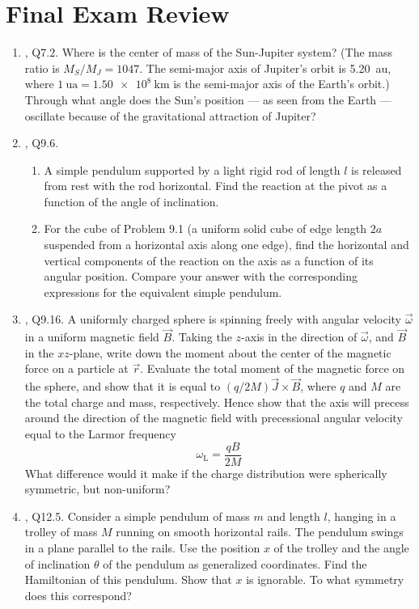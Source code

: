 \documentclass[../psets.tex]{subfiles}
\begin{document}
\section{Final Exam Review}
\begin{enumerate}
    \item {}\textcite{bib:KibbleBerkshire}, Q7.2. Where is the center of mass of the Sun-Jupiter system? (The mass ratio is $M_S/M_J=1047$. The semi-major axis of Jupiter's orbit is \SI{5.20}{\astronomicalunit}, where $\SI{1}{\astronomicalunit}=\SI{1.50e8}{\kilo\meter}$ is the semi-major axis of the Earth's orbit.) Through what angle does the Sun's position --- as seen from the Earth --- oscillate because of the gravitational attraction of Jupiter?
    \item \textcite{bib:KibbleBerkshire}, Q9.6.
    \begin{enumerate}
        \item A simple pendulum supported by a light rigid rod of length $l$ is released from rest with the rod horizontal. Find the reaction at the pivot as a function of the angle of inclination.
        \item For the cube of Problem 9.1 (a uniform solid cube of edge length $2a$ suspended from a horizontal axis along one edge), find the horizontal and vertical components of the reaction on the axis as a function of its angular position. Compare your answer with the corresponding expressions for the equivalent simple pendulum.
    \end{enumerate}
    \item \textcite{bib:KibbleBerkshire}, Q9.16. A uniformly charged sphere is spinning freely with angular velocity $\vec{\omega}$ in a uniform magnetic field $\vec{B}$. Taking the $z$-axis in the direction of $\vec{\omega}$, and $\vec{B}$ in the $xz$-plane, write down the moment about the center of the magnetic force on a particle at $\vec{r}$. Evaluate the total moment of the magnetic force on the sphere, and show that it is equal to $(q/2M)\vec{J}\times\vec{B}$, where $q$ and $M$ are the total charge and mass, respectively. Hence show that the axis will precess around the direction of the magnetic field with precessional angular velocity equal to the Larmor frequency
    \begin{equation*}
        \omega_\text{L} = \frac{qB}{2M}
    \end{equation*}
    What difference would it make if the charge distribution were spherically symmetric, but non-uniform?
    \item \textcite{bib:KibbleBerkshire}, Q12.5. Consider a simple pendulum of mass $m$ and length $l$, hanging in a trolley of mass $M$ running on smooth horizontal rails. The pendulum swings in a plane parallel to the rails. Use the position $x$ of the trolley and the angle of inclination $\theta$ of the pendulum as generalized coordinates. Find the Hamiltonian of this pendulum. Show that $x$ is ignorable. To what symmetry does this correspond?

\end{enumerate}
\end{document}
